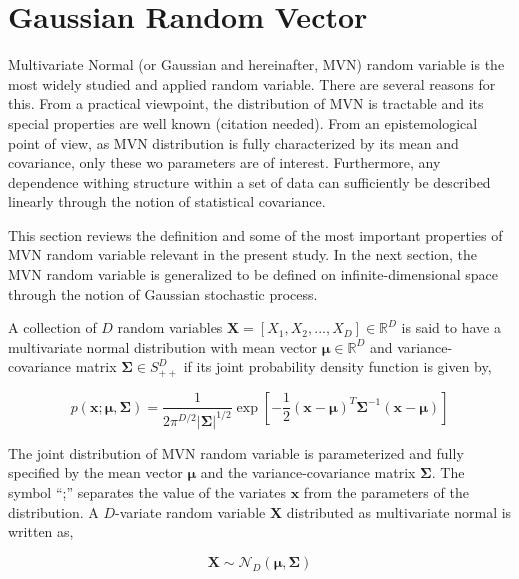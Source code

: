 \section{Gaussian Random Vector}\label{app:gaussian_vector}


Multivariate Normal (or Gaussian and hereinafter, \textsc{MVN}) random variable is the most widely studied and applied random variable.
There are several reasons for this.
From a practical viewpoint, 
the distribution of MVN is tractable and 
its special properties are well known (citation needed).
From an epistemological point of view, as MVN distribution is fully characterized by its mean and covariance, only these wo parameters are of interest.
Furthermore, any dependence withing structure within a set of data can sufficiently be described linearly through the notion of statistical covariance.

This section reviews the definition and some of the most important properties of MVN random variable relevant in the present study.
In the next section, the MVN random variable is generalized to be defined on infinite-dimensional space through the notion of Gaussian stochastic process.

A collection of $D$ random variables $\mathbf{X} = [X_1, X_2, ...,X_D] \in \mathbb{R}^D$ is said to have a multivariate normal distribution with mean vector $\boldsymbol{\mu} \in \mathbb{R}^D$ and variance-covariance matrix $\boldsymbol{\Sigma} \in S_{++}^D$ if its joint probability density function is given by,

\begin{equation}
p(\mathbf{x};\boldsymbol{\mu},\boldsymbol{\Sigma}) = \frac{1}{2\pi^{D/2}|\boldsymbol{\Sigma}|^{1/2}} \exp{\left[-\frac{1}{2}(\boldsymbol{x}-\boldsymbol{\mu})^T\boldsymbol{\Sigma}^{-1}(\boldsymbol{x}-\boldsymbol{\mu})\right]}
	\label{eq:gaussian_joint_density}
\end{equation}

The joint distribution of MVN random variable is parameterized and fully specified by the mean vector $\boldsymbol{\mu}$ and the variance-covariance matrix $\boldsymbol{\Sigma}$. The symbol ``;'' separates the value of the variates $\boldsymbol{x}$ from the parameters of the distribution. 
A $D$-variate random variable $\boldsymbol{X}$ distributed as multivariate normal is written as,

\begin{equation}
	\boldsymbol{X} \sim \mathcal{N}_D\left(\boldsymbol{\mu}, \boldsymbol{\Sigma}\right)
\end{equation}


